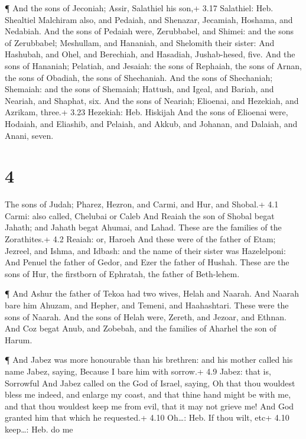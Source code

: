  ¶ And the sons of Jeconiah; Assir, Salathiel his son,+
3.17 Salathiel: Heb. Shealtiel  Malchiram also, and
Pedaiah, and Shenazar, Jecamiah, Hoshama, and Nedabiah. 
And the sons of Pedaiah were, Zerubbabel, and Shimei: and the sons of
Zerubbabel; Meshullam, and Hananiah, and Shelomith their sister:
 And Hashubah, and Ohel, and Berechiah, and Hasadiah,
Jushab-hesed, five.  And the sons of Hananiah; Pelatiah,
and Jesaiah: the sons of Rephaiah, the sons of Arnan, the sons of
Obadiah, the sons of Shechaniah.  And the sons of
Shechaniah; Shemaiah: and the sons of Shemaiah; Hattush, and Igeal, and
Bariah, and Neariah, and Shaphat, six.  And the sons of
Neariah; Elioenai, and Hezekiah, and Azrikam, three.+ 3.23 Hezekiah:
Heb. Hiskijah  And the sons of Elioenai were, Hodaiah, and
Eliashib, and Pelaiah, and Akkub, and Johanan, and Dalaiah, and Anani,
seven.

\hypertarget{section-3}{%
\section{4}\label{section-3}}

 The sons of Judah; Pharez, Hezron, and Carmi, and Hur, and
Shobal.+ 4.1 Carmi: also called, Chelubai or Caleb  And
Reaiah the son of Shobal begat Jahath; and Jahath begat Ahumai, and
Lahad. These are the families of the Zorathites.+ 4.2 Reaiah: or, Haroeh
 And these were of the father of Etam; Jezreel, and Ishma,
and Idbash: and the name of their sister was Hazelelponi: 
And Penuel the father of Gedor, and Ezer the father of Hushah. These are
the sons of Hur, the firstborn of Ephratah, the father of Beth-lehem.

 ¶ And Ashur the father of Tekoa had two wives, Helah and
Naarah.  And Naarah bare him Ahuzam, and Hepher, and Temeni,
and Haahashtari. These were the sons of Naarah.  And the
sons of Helah were, Zereth, and Jezoar, and Ethnan.  And Coz
begat Anub, and Zobebah, and the families of Aharhel the son of Harum.

 ¶ And Jabez was more honourable than his brethren: and his
mother called his name Jabez, saying, Because I bare him with sorrow.+
4.9 Jabez: that is, Sorrowful  And Jabez called on the God
of Israel, saying, Oh that thou wouldest bless me indeed, and enlarge my
coast, and that thine hand might be with me, and that thou wouldest keep
me from evil, that it may not grieve me! And God granted him that which
he requested.+ 4.10 Oh\ldots: Heb. If thou wilt, etc+ 4.10 keep\ldots:
Heb. do me

